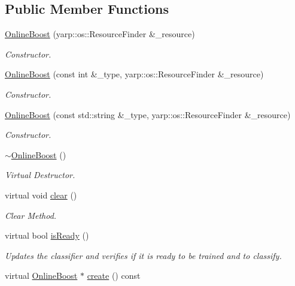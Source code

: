 \subsection*{Public Member Functions}
\begin{DoxyCompactItemize}
\item 
\hyperlink{classiCub_1_1boostMIL_1_1OnlineBoost_a92fc331c60f7608c0d321ecf57a113ac}{Online\+Boost} (yarp\+::os\+::\+Resource\+Finder \&\+\_\+resource)
\begin{DoxyCompactList}\small\item\em Constructor. \end{DoxyCompactList}\item 
\hyperlink{classiCub_1_1boostMIL_1_1OnlineBoost_a1eadaa74d501594cbea6bdb243fd111b}{Online\+Boost} (const int \&\+\_\+type, yarp\+::os\+::\+Resource\+Finder \&\+\_\+resource)
\begin{DoxyCompactList}\small\item\em Constructor. \end{DoxyCompactList}\item 
\hyperlink{classiCub_1_1boostMIL_1_1OnlineBoost_afbf710e0e9455a5b0215e998c3c33acd}{Online\+Boost} (const std\+::string \&\+\_\+type, yarp\+::os\+::\+Resource\+Finder \&\+\_\+resource)
\begin{DoxyCompactList}\small\item\em Constructor. \end{DoxyCompactList}\item 
\hyperlink{classiCub_1_1boostMIL_1_1OnlineBoost_ab631701e7e889e994e589ef0da88263e}{$\sim$\+Online\+Boost} ()\label{classiCub_1_1boostMIL_1_1OnlineBoost_ab631701e7e889e994e589ef0da88263e}

\begin{DoxyCompactList}\small\item\em Virtual Destructor. \end{DoxyCompactList}\item 
virtual void \hyperlink{classiCub_1_1boostMIL_1_1OnlineBoost_a7b725fb242d59067afce0030f6f8d259}{clear} ()
\begin{DoxyCompactList}\small\item\em Clear Method. \end{DoxyCompactList}\item 
virtual bool \hyperlink{classiCub_1_1boostMIL_1_1OnlineBoost_a672bc56c42b3b4aa9bde7ac52d0ace5f}{is\+Ready} ()
\begin{DoxyCompactList}\small\item\em Updates the classifier and verifies if it is ready to be trained and to classify. \end{DoxyCompactList}\item 
virtual \hyperlink{classiCub_1_1boostMIL_1_1OnlineBoost}{Online\+Boost} $\ast$ \hyperlink{classiCub_1_1boostMIL_1_1OnlineBoost_a843c5639ff6ddb094eb6b1e0d1a09a67}{create} () const \label{classiCub_1_1boostMIL_1_1OnlineBoost_a843c5639ff6ddb094eb6b1e0d1a09a67}


\end{DoxyCompactItemize}
